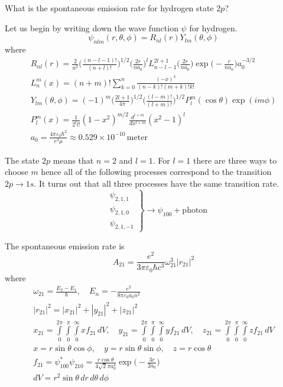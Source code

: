 \documentclass[12pt]{article}
\begin{document}
What is the spontaneous emission rate for hydrogen state 2$p$?

\bigskip
Let us begin by writing down the wave function $\psi$ for hydrogen.
\begin{equation*}
\psi_{nlm}(r,\theta,\phi)=R_{nl}(r)Y_{lm}(\theta,\phi)
\end{equation*}
where
\begin{gather*}
R_{nl}(r)=
\frac{2}{n^2}
\bigg(\frac{(n-l-1)!}{(n+l)!}\bigg)^{1/2}
\bigg(\frac{2r}{na_0}\bigg)^l
L_{n-l-1}^{2l+1}\bigg(\frac{2r}{na_0}\bigg)
\exp\bigg({-}\frac{r}{na_0}\bigg)
a_0^{-3/2}
\\
L_n^m(x)=(n+m)!\sum_{k=0}^n\frac{(-x)^k}{(n-k)!(m+k)!k!}
\\
Y_{lm}(\theta,\phi)=(-1)^m
\bigg(\frac{2l+1}{4\pi}\bigg)^{1/2}
\bigg(\frac{(l-m)!}{(l+m)!}\bigg)^{1/2}
P_l^m(\cos\theta)\exp(im\phi)
\\
P_l^m(x)=\frac{1}{2^l l!}(1-x^2)^{m/2}\frac{d^{l+m}}{dx^{l+m}}(x^2-1)^l
\\
a_0=\frac{4\pi\varepsilon_0\hbar^2}{e^2\mu}\approx0.529\times10^{-10}\,\text{meter}
\end{gather*}

The state $2p$ means that $n=2$ and $l=1$.
For $l=1$ there are three ways to choose $m$ hence all of the following processes correspond to the transition
$2p\rightarrow1s$.
It turns out that all three processes have the same transition rate.
\begin{equation*}
\left.\begin{aligned}
&\psi_{2,1,1}
\\
&\psi_{2,1,0}
\\
&\psi_{2,1,-1}
\end{aligned}\right\}\rightarrow\psi_{100}+\text{photon}
\end{equation*}

The spontaneous emission rate is
\begin{equation*}
A_{21}=\frac{e^2}{3\pi\varepsilon_0\hbar c^3}\omega_{21}^3|r_{21}|^2
\tag{1}
\end{equation*}
where
\begin{gather*}
\omega_{21}=\frac{E_2-E_1}{\hbar},\quad E_n=-\frac{e^2}{8\pi\varepsilon_0a_0n^2}
\\
|r_{21}|^2=|x_{21}|^2+|y_{21}|^2+|z_{21}|^2
\\
x_{21}=\int\limits_{0}^{2\pi}\int\limits_{0}^{\pi}\int\limits_{0}^{\infty}xf_{21}\,dV,
\quad
y_{21}=\int\limits_{0}^{2\pi}\int\limits_{0}^{\pi}\int\limits_{0}^{\infty}yf_{21}\,dV,
\quad
z_{21}=\int\limits_{0}^{2\pi}\int\limits_{0}^{\pi}\int\limits_{0}^{\infty}zf_{21}\,dV
\\
x=r\sin\theta\cos\phi,
\quad
y=r\sin\theta\sin\phi,
\quad
z=r\cos\theta
\\
f_{21}=\psi_{100}^*\psi_{210}=\frac{r\cos\theta}{4\sqrt2\pi a_0^4}\exp\bigg({-}\frac{3r}{2a_0}\bigg)
\\
dV=r^2\sin\theta\,dr\,d\theta\,d\phi
\end{gather*}
\end{document}
